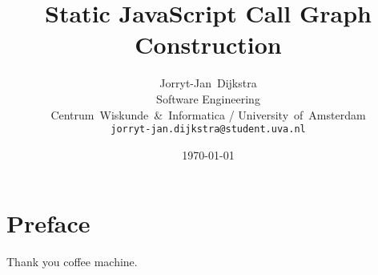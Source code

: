 \documentclass[journal,10pt]{IEEEtran} %
\begin{document}
\setlength{\grammarindent}{6em}
\renewcommand{\syntleft}{}          %
\renewcommand{\syntright}{}         %


\title{Static JavaScript Call Graph Construction}
\author{Jorryt-Jan~Dijkstra \\ Software Engineering \\ Centrum~Wiskunde~\&~Informatica / University~of~Amsterdam \\ \texttt{jorryt-jan.dijkstra@student.uva.nl}}
\date{\today}

\maketitle



\section*{Preface}
Thank you coffee machine.



\end{document}
